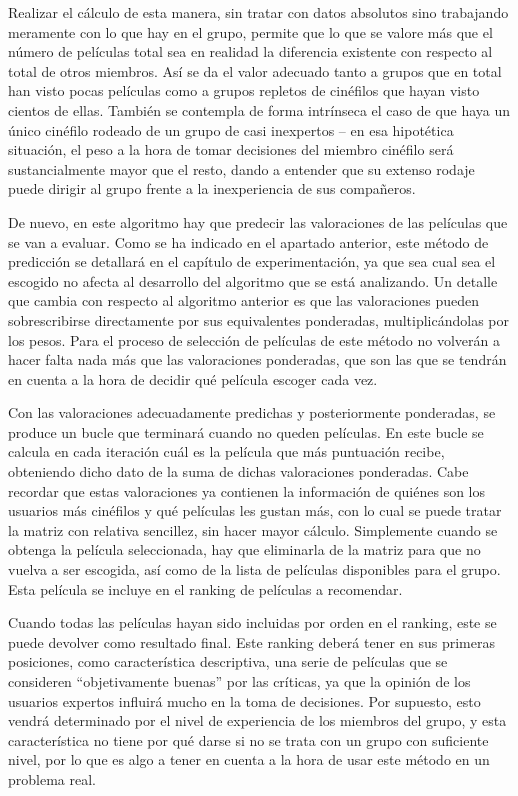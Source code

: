 Realizar el cálculo de esta manera, sin tratar con datos absolutos sino trabajando meramente con lo que hay en el grupo, permite que lo que se valore más que el número de películas total sea en realidad la diferencia existente con respecto al total de otros miembros. Así se da el valor adecuado tanto a grupos que en total han visto pocas películas como a grupos repletos de cinéfilos que hayan visto cientos de ellas. También se contempla de forma intrínseca el caso de que haya un único cinéfilo rodeado de un grupo de casi inexpertos -- en esa hipotética situación, el peso a la hora de tomar decisiones del miembro cinéfilo será sustancialmente mayor que el resto, dando a entender que su extenso rodaje puede dirigir al grupo frente a la inexperiencia de sus compañeros.

De nuevo, en este algoritmo hay que predecir las valoraciones de las películas que se van a evaluar. Como se ha indicado en el apartado anterior, este método de predicción se detallará en el capítulo de experimentación, ya que sea cual sea el escogido no afecta al desarrollo del algoritmo que se está analizando. Un detalle que cambia con respecto al algoritmo anterior es que las valoraciones pueden sobrescribirse directamente por sus equivalentes ponderadas, multiplicándolas por los pesos. Para el proceso de selección de películas de este método no volverán a hacer falta nada más que las valoraciones ponderadas, que son las que se tendrán en cuenta a la hora de decidir qué película escoger cada vez.

Con las valoraciones adecuadamente predichas y posteriormente ponderadas, se produce un bucle que terminará cuando no queden películas. En este bucle se calcula en cada iteración cuál es la película que más puntuación recibe, obteniendo dicho dato de la suma de dichas valoraciones ponderadas. Cabe recordar que estas valoraciones ya contienen la información de quiénes son los usuarios más cinéfilos y qué películas les gustan más, con lo cual se puede tratar la matriz con relativa sencillez, sin hacer mayor cálculo. Simplemente cuando se obtenga la película seleccionada, hay que eliminarla de la matriz para que no vuelva a ser escogida, así como de la lista de películas disponibles para el grupo. Esta película se incluye en el ranking de películas a recomendar.

Cuando todas las películas hayan sido incluidas por orden en el ranking, este se puede devolver como resultado final. Este ranking deberá tener en sus primeras posiciones, como característica descriptiva, una serie de películas que se consideren ``objetivamente buenas'' por las críticas, ya que la opinión de los usuarios expertos influirá mucho en la toma de decisiones. Por supuesto, esto vendrá determinado por el nivel de experiencia de los miembros del grupo, y esta característica no tiene por qué darse si no se trata con un grupo con suficiente nivel, por lo que es algo a tener en cuenta a la hora de usar este método en un problema real.

